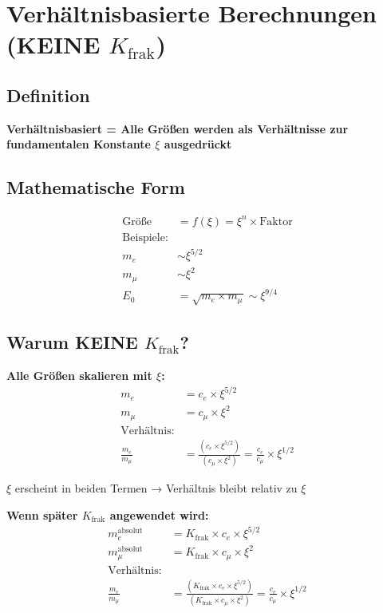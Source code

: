 	\section{Verhältnisbasierte Berechnungen (KEINE $K_{\text{frak}}$)}
	
	\subsection{Definition}
	
	\textbf{Verhältnisbasiert = Alle Größen werden als Verhältnisse zur fundamentalen Konstante $\xi$ ausgedrückt}
	
	\subsection{Mathematische Form}
	\begin{align*}
		\text{Größe} &= f(\xi) = \xi^n \times \text{Faktor} \\
		\text{Beispiele:} & \\
		m_e &\sim \xi^{5/2} \\
		m_μ &\sim \xi^2 \\
		E_0 &= \sqrt{m_e \times m_μ} \sim \xi^{9/4}
	\end{align*}
	
	\subsection{Warum KEINE $K_{\text{frak}}$?}
	
	\textbf{Alle Größen skalieren mit $\xi$:}
	\begin{align*}
		m_e &= c_e \times \xi^{5/2} \\
		m_μ &= c_μ \times \xi^2 \\
		\text{Verhältnis:} & \\
		\frac{m_e}{m_μ} &= \frac{(c_e \times \xi^{5/2})}{(c_μ \times \xi^2)} = \frac{c_e}{c_μ} \times \xi^{1/2}
	\end{align*}
	
	$\xi$ erscheint in beiden Termen → Verhältnis bleibt relativ zu $\xi$
	
	\textbf{Wenn später $K_{\text{frak}}$ angewendet wird:}
	\begin{align*}
		m_e^{\text{absolut}} &= K_{\text{frak}} \times c_e \times \xi^{5/2} \\
		m_μ^{\text{absolut}} &= K_{\text{frak}} \times c_μ \times \xi^2 \\
		\text{Verhältnis:} & \\
		\frac{m_e}{m_μ} &= \frac{(K_{\text{frak}} \times c_e \times \xi^{5/2})}{(K_{\text{frak}} \times c_μ \times \xi^2)} = \frac{c_e}{c_μ} \times \xi^{1/2}
	\end{align*}
	
